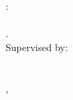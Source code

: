 \thispagestyle{empty}

\hfill

\vfill

\noindent\spacedlowsmallcaps{\myName}: \\
\textit{\myTitle} \\
{\small\textit{\mySubtitle}}. \\[\baselineskip]
\noindent Supervised by: \\
{\spacedlowsmallcaps{\myProf} \\
\spacedlowsmallcaps{\myOtherProf}} \\[\baselineskip]
\myLocation, \myTime
